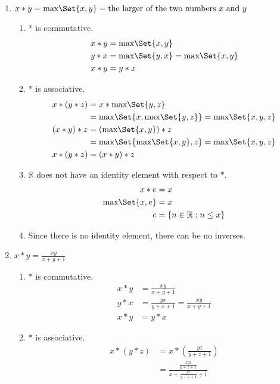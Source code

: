 \begin{enumerate}[label={\Alph*.},font={\bfseries}]
\begin{enumerate}[label={\arabic*},font={\bfseries}]
  \item $x*y=\text{max}\Set{x,y}=\text{the larger of the two numbers $x$ and $y$}$
    \begin{enumerate}[label={(\roman*)}]
    \item $*$ is commutative.
      \begin{align*}
        x*y &= \text{max}\Set{x,y} \\
        y*x &= \text{max}\Set{y,x} = \text{max}\Set{x,y} \\
        x*y &= y*x
      \end{align*}
    \item $*$ is associative.
      \begin{align*}
        x*(y*z) &= x*\text{max}\Set{y,z} \\
        &= \text{max}\Set{x,\text{max}\Set{y,z}} = \text{max}\Set{x,y,z} \\
        (x*y)*z &= (\text{max}\Set{x,y})*z \\
        &= \text{max}\Set{\text{max}\Set{x,y},z} = \text{max}\Set{x,y,z} \\
        x*(y*z) &= (x*y)*z
      \end{align*}
    \item $\mathbb{R}$ does not have an identity element with respect to $*$.
      \begin{align*}
        x*e &= x \\
        \text{max}\Set{x,e} &= x \\
        e &= \{ n\in\mathbb{R} : n \leq x \}
      \end{align*}
    \item Since there is no identity element, there can be no inverses.
    \end{enumerate}
  \item $x*y=\frac{xy}{x+y+1}$
    \begin{enumerate}[label={(\roman*)}]
    \item $*$ is commutative.
      \begin{align*}
        x*y &= \frac{xy}{x+y+1} \\
        y*x &= \frac{yx}{y+x+1} = \frac{xy}{x+y+1} \\
        x*y &= y*x
      \end{align*}
    \item $*$ is associative.
      \begin{align*}
        x*(y*z) &= x*(\frac{yz}{y+z+1}) \\
        &= \frac{\frac{xyz}{y+z+1}}{x+\frac{yz}{y+z+1}+1} \\

\end{align*}
\end{enumerate}
\end{enumerate}
\end{enumerate}
